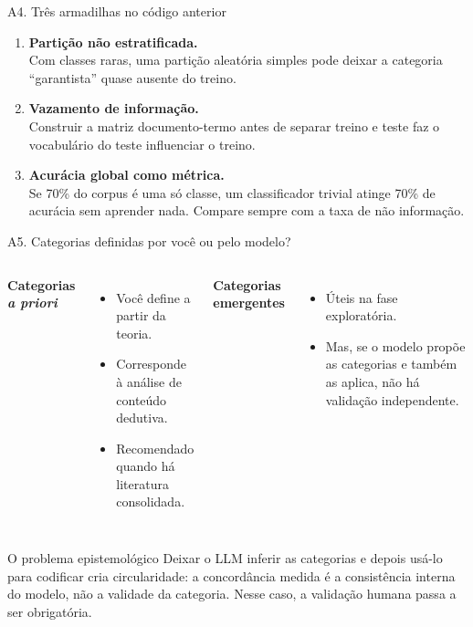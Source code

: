 \documentclass[11pt,aspectratio=169]{beamer}
\begin{document}
\begin{frame}{A4. Três armadilhas no código anterior}
\begin{enumerate}
  \item \textbf{Partição não estratificada.}\\
        \small Com classes raras, uma partição aleatória simples pode deixar a
        categoria ``garantista'' quase ausente do treino.
  \vspace{0.2cm}
  \item \normalsize \textbf{Vazamento de informação.}\\
        \small Construir a matriz documento-termo antes de separar treino e
        teste faz o vocabulário do teste influenciar o treino.
  \vspace{0.2cm}
  \item \normalsize \textbf{Acurácia global como métrica.}\\
        \small Se 70\% do corpus é uma só classe, um classificador trivial
        atinge 70\% de acurácia sem aprender nada. Compare sempre com a taxa de
        não informação.
\end{enumerate}
\end{frame}

\begin{frame}{A5. Categorias definidas por você ou pelo modelo?}
\begin{columns}[T]
\textbf{Categorias \emph{a priori}}
\begin{itemize}\small
  \item Você define a partir da teoria.
  \item Corresponde à análise de conteúdo dedutiva.
  \item Recomendado quando há literatura consolidada.
\end{itemize}
\textbf{Categorias emergentes}
\begin{itemize}\small
  \item Úteis na fase exploratória.
  \item Mas, se o modelo propõe as categorias e também as aplica, não há
        validação independente.
\end{itemize}
\end{columns}
\vspace{0.3cm}
\begin{alertblock}{O problema epistemológico}
\small
Deixar o LLM inferir as categorias e depois usá-lo para codificar cria
circularidade: a concordância medida é a consistência interna do modelo, não a
validade da categoria. Nesse caso, a validação humana passa a ser obrigatória.
\end{alertblock}
\end{frame}
\end{document}
